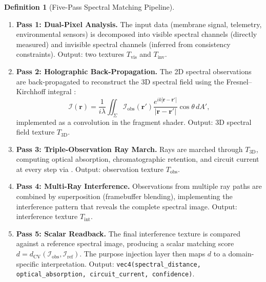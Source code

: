 \documentclass[11pt,twocolumn,a4paper]{article}
\theoremstyle{definition}
\newtheorem{definition}[theorem]{Definition}
\theoremstyle{remark}
\newcommand{\dcv}{d_{\mathrm{CV}}}
\begin{document}
\begin{definition}[Five-Pass Spectral Matching Pipeline]\label{def:five-pass}
\begin{enumerate}
    \item \textbf{Pass 1: Dual-Pixel Analysis.}  The input data (membrane signal, telemetry, environmental sensors) is decomposed into visible spectral channels (directly measured) and invisible spectral channels (inferred from consistency constraints).  Output: two textures $T_{\mathrm{vis}}$ and $T_{\mathrm{inv}}$.

    \item \textbf{Pass 2: Holographic Back-Propagation.}  The 2D spectral observations are back-propagated to reconstruct the 3D spectral field using the Fresnel--Kirchhoff integral \citep{fresnel1818memoire, huygens1690traite}:
    \begin{equation}\label{eq:fresnel-kirchhoff}
        \mathcal{I}(\mathbf{r}) = \frac{1}{i\lambda} \iint_{\Sigma} \mathcal{I}_{\mathrm{obs}}(\mathbf{r}') \frac{e^{ik|\mathbf{r}-\mathbf{r}'|}}{|\mathbf{r}-\mathbf{r}'|} \cos\theta \, dA',
    \end{equation}
    implemented as a convolution in the fragment shader.  Output: 3D spectral field texture $T_{\mathrm{3D}}$.

    \item \textbf{Pass 3: Triple-Observation Ray March.}  Rays are marched through $T_{\mathrm{3D}}$, computing optical absorption, chromatographic retention, and circuit current at every step via .  Output: observation texture $T_{\mathrm{obs}}$.

    \item \textbf{Pass 4: Multi-Ray Interference.}  Observations from multiple ray paths are combined by superposition (framebuffer blending), implementing the interference pattern that reveals the complete spectral image.  Output: interference texture $T_{\mathrm{int}}$.

    \item \textbf{Pass 5: Scalar Readback.}  The final interference texture is compared against a reference spectral image, producing a scalar matching score $d = \dcv(\mathcal{I}_{\mathrm{obs}}, \mathcal{I}_{\mathrm{ref}})$.  The purpose injection layer then maps $d$ to a domain-specific interpretation.  Output: \texttt{vec4(spectral\_distance, optical\_absorption, circuit\_current, confidence)}.
\end{enumerate}
\end{definition}
\end{document}
